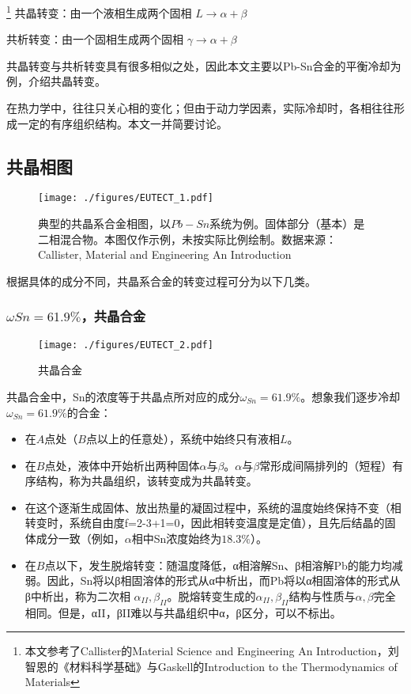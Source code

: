 
\footnote{本文参考了Callister的Material Science and Engineering An Introduction，刘智恩的《材料科学基础》与Gaskell的Introduction to the Thermodynamics of Materials}
共晶转变：由一个液相生成两个固相 $L \rightarrow \alpha+\beta$

共析转变：由一个固相生成两个固相 $\gamma \rightarrow \alpha+\beta$

共晶转变与共析转变具有很多相似之处，因此本文主要以Pb-Sn合金的平衡冷却为例，介绍共晶转变。

在热力学中，往往只关心相的变化；但由于动力学因素，实际冷却时，各相往往形成一定的有序组织结构。本文一并简要讨论。

\subsection{共晶相图}
\begin{figure}[ht]
\centering
\texttt{[image: ./figures/EUTECT\_1.pdf]}
\caption{典型的共晶系合金相图，以$Pb-Sn$系统为例。固体部分（基本）是二相混合物。本图仅作示例，未按实际比例绘制。数据来源：Callister, Material and Engineering An Introduction} \label{EUTECT_fig1}
\end{figure}
根据具体的成分不同，共晶系合金的转变过程可分为以下几类。

\subsubsection{$\omega Sn=61.9\%$，共晶合金}
\begin{figure}[ht]
\centering
\texttt{[image: ./figures/EUTECT\_2.pdf]}
\caption{共晶合金} \label{EUTECT_fig2}
\end{figure}

共晶合金中，Sn的浓度等于共晶点所对应的成分$\omega_{Sn}=61.9\%$。想象我们逐步冷却$\omega_{Sn}=61.9\%$的合金：
\begin{itemize}
\item 在$A$点处（$B$点以上的任意处），系统中始终只有液相$L$。
\item 在$B$点处，液体中开始析出两种固体$\alpha$与$\beta$。$\alpha$与$\beta$常形成间隔排列的（短程）有序结构，称为共晶组织，该转变成为共晶转变。
\item 在这个逐渐生成固体、放出热量的凝固过程中，系统的温度始终保持不变（相转变时，系统自由度f=2-3+1=0，因此相转变温度是定值），且先后结晶的固体成分一致（例如，$\alpha$相中Sn浓度始终为$18.3\%$）。
\item 在$B$点以下，发生脱熔转变：随温度降低，α相溶解Sn、β相溶解Pb的能力均减弱。因此，Sn将以β相固溶体的形式从α中析出，而Pb将以α相固溶体的形式从β中析出，称为二次相 $\alpha_{II},\beta_{II} $。脱熔转变生成的$\alpha_{II},\beta_{II} $结构与性质与$\alpha, \beta$完全相同。但是，αII，βII难以与共晶组织中α，β区分，可以不标出。
\end{itemize}

